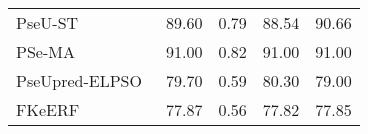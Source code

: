 \begin{tabular}{lcccc}
  PseU-ST~\cite{zhang_pseu-st_2023}              & 89.60             & 0.79         & 88.54            & 90.66            \\
  PSe-MA~\cite{patil_novel_2023}                 & 91.00             & 0.82         & 91.00            & 91.00            \\
  PseUpred-ELPSO~\cite{wang_pseupred-elpso_2024} & 79.70             & 0.59         & 80.30            & 79.00            \\
  FKeERF~\cite{chen_fuzzy_2024}                  & 77.87             & 0.56         & 77.82            & 77.85            \\
  \bottomrule
\end{tabular}